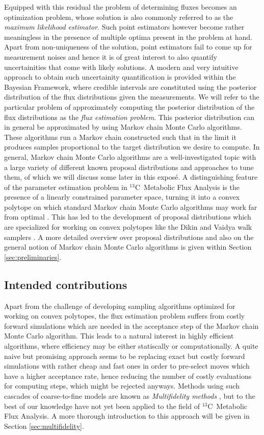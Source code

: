 \documentclass[10pt]{article}
\newcommand{\Ciso}{$^{13}$C~}
\newcommand{\todo}[1]{{\color{red}#1}}
\begin{document}
Equipped with this residual the problem of determining fluxes becomes an optimization problem,
whose solution is also commonly referred to as the \emph{maximum likelihood estimator}.
Such point estimators however become rather meaningless in the presence of multiple optima 
present in the problem at hand.
Apart from non-uniqueness of the solution, point estimators fail to come up for measurement 
noises and hence it is of great interest to also quantify uncertainities that come with likely
solutions.
A modern and very intuitive approach to obtain such uncertainity quantification is provided 
within the Bayesian Framework, where credible intervals are constituted using the posterior 
distribution of the flux distributions given the measurements.
We will refer to the particular problem of approximately computing the posterior distribution of 
the flux distributions as the \emph{flux estimation problem}.
This posterior distribution can in general be approximated by using Markov chain Monte Carlo 
algorithms.
These algorithms run a Markov chain constructed such that in the limit it produces samples 
proportional to the target distribution we desire to compute. 
In general, Markov chain Monte Carlo algorithms are a well-investigated topic \cite{} with a 
large variety of different known proposal distributions and approaches to tune them, of which we 
will discuss some later in this expos\'e.
A distinguishing feature of the parameter estimation problem in \Ciso Metabolic Flux Analysis is 
the presence of a linearly constrained parameter space, turning it into a convex polytope on 
which standard Markov chain Monte Carlo algorithms may work far from optimal \todo{\cite{?}}.
This has led to the development of proposal distributions which are specialized for working on 
convex polytopes like the Dikin and Vaidya walk samplers \cite{chen17, kannan12}.
A more detailed overview over proposal distributions and also on the general notion of Markov 
chain Monte Carlo algorithms is given within Section \ref{sec:preliminaries}.

\subsection{Intended contributions}

Apart from the challenge of developing sampling algorithms optimized for working on convex 
polytopes, the flux estimation problem suffers from costly forward simulations which are needed 
in the acceptance step of the Markov chain Monte Carlo algorithm.
This leads to a natural interest in highly efficient algorithms, where efficiency may be either 
statiscally or computationally.
A quite naive but promising approach seems to be replacing exact but costly forward simulations 
with rather cheap and fast ones in order to pre-select moves which have a higher acceptance rate,
hence reducing the number of costly evaluations for computing steps, which might be rejected 
anyways.
Methods using such cascades of coarse-to-fine models are known as \emph{Multifidelity methods} 
\cite{efendiev06, peherstorfer18}, but to the best of our knowledge have not yet been applied to 
the field of \Ciso Metabolic Flux Analysis.
A more thorough introduction to this approach will be given in Section \ref{sec:multifidelity}.
\end{document}
